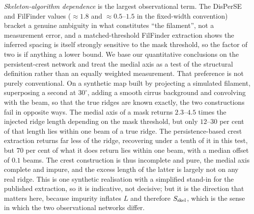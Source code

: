 \documentclass[usenatbib,twoside,twocolumn]{mnras}
\begin{document}
\emph{Skeleton-algorithm dependence} is the largest observational term. The DisPerSE and FilFinder values ($\approx1.8$ and $\approx0.5$--$1.5$ in the fixed-width convention) bracket a genuine ambiguity in what constitutes ``the filament'', not a measurement error, and a matched-threshold FilFinder extraction shows the inferred spacing is itself strongly sensitive to the mask threshold, so the factor of two is if anything a lower bound. We base our quantitative conclusions on the persistent-crest network and treat the medial axis as a test of the structural definition rather than an equally weighted measurement. That preference is not purely conventional. On a synthetic map built by projecting a simulated filament, superposing a second at $30^\circ$, adding a smooth cirrus background and convolving with the beam, so that the true ridges are known exactly, the two constructions fail in opposite ways. The medial axis of a mask returns $2.3$--$4.5$ times the injected ridge length depending on the mask threshold, but only $12$--$30$ per cent of that length lies within one beam of a true ridge. The persistence-based crest extraction returns far less of the ridge, recovering under a tenth of it in this test, but $70$ per cent of what it does return lies within one beam, with a median offset of $0.1$ beams. The crest construction is thus incomplete and pure, the medial axis complete and impure, and the excess length of the latter is largely not on any real ridge. This is one synthetic realisation with a simplified stand-in for the published extraction, so it is indicative, not decisive; but it is the direction that matters here, because impurity inflates $L$ and therefore $S_{\rm skel}$, which is the sense in which the two observational networks differ.
\end{document}
